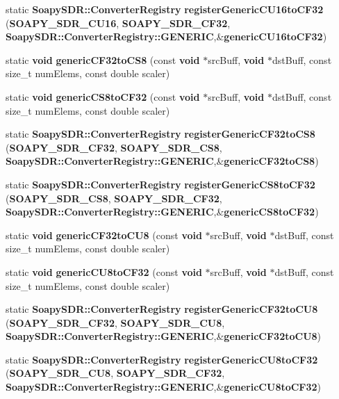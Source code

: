 \begin{DoxyCompactItemize}
\item 
static {\bf Soapy\+S\+D\+R\+::\+Converter\+Registry} {\bf register\+Generic\+C\+U16to\+C\+F32} ({\bf S\+O\+A\+P\+Y\+\_\+\+S\+D\+R\+\_\+\+C\+U16}, {\bf S\+O\+A\+P\+Y\+\_\+\+S\+D\+R\+\_\+\+C\+F32}, {\bf Soapy\+S\+D\+R\+::\+Converter\+Registry\+::\+G\+E\+N\+E\+R\+IC},\&{\bf generic\+C\+U16to\+C\+F32})
\item 
static {\bf void} {\bf generic\+C\+F32to\+C\+S8} (const {\bf void} $\ast$src\+Buff, {\bf void} $\ast$dst\+Buff, const size\+\_\+t num\+Elems, const double scaler)
\item 
static {\bf void} {\bf generic\+C\+S8to\+C\+F32} (const {\bf void} $\ast$src\+Buff, {\bf void} $\ast$dst\+Buff, const size\+\_\+t num\+Elems, const double scaler)
\item 
static {\bf Soapy\+S\+D\+R\+::\+Converter\+Registry} {\bf register\+Generic\+C\+F32to\+C\+S8} ({\bf S\+O\+A\+P\+Y\+\_\+\+S\+D\+R\+\_\+\+C\+F32}, {\bf S\+O\+A\+P\+Y\+\_\+\+S\+D\+R\+\_\+\+C\+S8}, {\bf Soapy\+S\+D\+R\+::\+Converter\+Registry\+::\+G\+E\+N\+E\+R\+IC},\&{\bf generic\+C\+F32to\+C\+S8})
\item 
static {\bf Soapy\+S\+D\+R\+::\+Converter\+Registry} {\bf register\+Generic\+C\+S8to\+C\+F32} ({\bf S\+O\+A\+P\+Y\+\_\+\+S\+D\+R\+\_\+\+C\+S8}, {\bf S\+O\+A\+P\+Y\+\_\+\+S\+D\+R\+\_\+\+C\+F32}, {\bf Soapy\+S\+D\+R\+::\+Converter\+Registry\+::\+G\+E\+N\+E\+R\+IC},\&{\bf generic\+C\+S8to\+C\+F32})
\item 
static {\bf void} {\bf generic\+C\+F32to\+C\+U8} (const {\bf void} $\ast$src\+Buff, {\bf void} $\ast$dst\+Buff, const size\+\_\+t num\+Elems, const double scaler)
\item 
static {\bf void} {\bf generic\+C\+U8to\+C\+F32} (const {\bf void} $\ast$src\+Buff, {\bf void} $\ast$dst\+Buff, const size\+\_\+t num\+Elems, const double scaler)
\item 
static {\bf Soapy\+S\+D\+R\+::\+Converter\+Registry} {\bf register\+Generic\+C\+F32to\+C\+U8} ({\bf S\+O\+A\+P\+Y\+\_\+\+S\+D\+R\+\_\+\+C\+F32}, {\bf S\+O\+A\+P\+Y\+\_\+\+S\+D\+R\+\_\+\+C\+U8}, {\bf Soapy\+S\+D\+R\+::\+Converter\+Registry\+::\+G\+E\+N\+E\+R\+IC},\&{\bf generic\+C\+F32to\+C\+U8})
\item 
static {\bf Soapy\+S\+D\+R\+::\+Converter\+Registry} {\bf register\+Generic\+C\+U8to\+C\+F32} ({\bf S\+O\+A\+P\+Y\+\_\+\+S\+D\+R\+\_\+\+C\+U8}, {\bf S\+O\+A\+P\+Y\+\_\+\+S\+D\+R\+\_\+\+C\+F32}, {\bf Soapy\+S\+D\+R\+::\+Converter\+Registry\+::\+G\+E\+N\+E\+R\+IC},\&{\bf generic\+C\+U8to\+C\+F32})
\item 

\end{DoxyCompactItemize}
